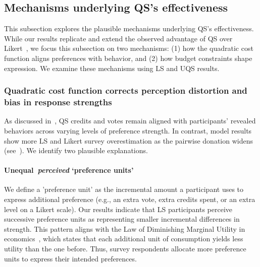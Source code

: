 \subsection{Mechanisms underlying QS's effectiveness}
This subsection explores the plausible mechanisms underlying QS's effectiveness. While our results replicate and extend the observed advantage of QS over Likert~\cite{chengCanShowWhat2021}, we focus this subsection on two mechanisms: (1) how the quadratic cost function aligns preferences with behavior, and (2) how budget constraints shape expression. We examine these mechanisms using LS and UQS results.

\subsubsection{Quadratic cost function corrects perception distortion and bias in response strengths}
As discussed in~, QS credits and votes remain aligned with participants' revealed behaviors across varying levels of preference strength. In contrast, model results show more LS and Likert survey overestimation as the pairwise donation widens (see~). We identify two plausible explanations.

\paragraph{Unequal~\textit{perceived} `preference units'}
We define a 'preference unit' as the incremental amount a participant uses to express additional preference (e.g., an extra vote, extra credits spent, or an extra level on a Likert scale). Our results indicate that LS participants perceive successive preference units as representing smaller incremental differences in strength. This pattern aligns with the Law of Diminishing Marginal Utility in economics~\cite{gossen1983laws, kahnemanProspectTheoryAnalysis1979}, which states that each additional unit of consumption yields less utility than the one before. Thus, survey respondents allocate more preference units to express their intended preferences.

